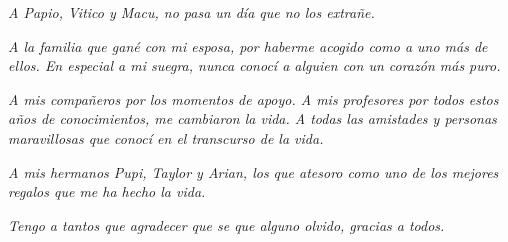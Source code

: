 \begin{acknowledgements}
\begin{flushleft}
{		\emph{	A Papio, Vitico y Macu, no pasa un día que no los extrañe. }
			\newline
		
		\emph{	A la familia que gané con mi esposa, por haberme acogido como a uno más de ellos. En especial a mi suegra, nunca conocí a alguien con un corazón más puro. }
			\newline
			
		\emph{	A mis compañeros por los momentos de apoyo. A mis profesores por todos estos años de conocimientos, me cambiaron la vida. A todas las amistades y personas maravillosas que conocí en el transcurso de la vida.}
			\newline
			
		\emph{	A mis hermanos Pupi, Taylor y Arian, los que atesoro como uno de los mejores regalos que me ha hecho la vida.}
			\newline
			
		\emph{Tengo a tantos que agradecer que se que alguno olvido, gracias a todos.}}

	\end{flushleft}

   
   
   
  
 
  
   
   
  
   
\end{acknowledgements}